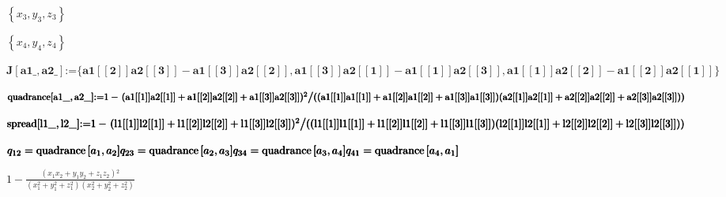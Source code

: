 \documentclass{article}
\begin{document}
\begin{doublespace}
\noindent\(\left\{x_3,y_3,z_3\right\}\)
\end{doublespace}

\begin{doublespace}
\noindent\(\left\{x_4,y_4,z_4\right\}\)
\end{doublespace}

\begin{doublespace}
\noindent\(\pmb{J[\text{a1$\_$},\text{a2$\_$}]\text{:=} \{\text{a1}[[2]]\text{a2}[[3]] - \text{a1}[[3]]\text{a2}[[2]], \text{a1}[[3]]\text{a2}[[1]]-\text{a1}[[1]]\text{a2}[[3]],
\text{a1}[[1]]\text{a2}[[2]]-\text{a1}[[2]]\text{a2}[[1]]\}}\)
\end{doublespace}

\begin{doublespace}
\noindent\(\pmb{\text{quadrance}[\text{a1$\_$},\text{a2$\_$}]\text{:=} }\\
\pmb{1 - \left.(\text{a1}[[1]]\text{a2}[[1]]+\text{a1}[[2]]\text{a2}[[2]]+\text{a1}[[3]]\text{a2}[[3]])^2\right/}\\
\pmb{((\text{a1}[[1]]\text{a1}[[1]]+\text{a1}[[2]]\text{a1}[[2]]+\text{a1}[[3]]\text{a1}[[3]])(\text{a2}[[1]]\text{a2}[[1]]+\text{a2}[[2]]\text{a2}[[2]]+\text{a2}[[3]]\text{a2}[[3]]))}\)
\end{doublespace}

\begin{doublespace}
\noindent\(\pmb{\text{spread}[\text{l1$\_$},\text{l2$\_$}]\text{:=} }\\
\pmb{1 - \left.(\text{l1}[[1]]\text{l2}[[1]]+\text{l1}[[2]]\text{l2}[[2]]+\text{l1}[[3]]\text{l2}[[3]])^2\right/}\\
\pmb{((\text{l1}[[1]]\text{l1}[[1]]+\text{l1}[[2]]\text{l1}[[2]]+\text{l1}[[3]]\text{l1}[[3]])(\text{l2}[[1]]\text{l2}[[1]]+\text{l2}[[2]]\text{l2}[[2]]+\text{l2}[[3]]\text{l2}[[3]]))}\)
\end{doublespace}

\begin{doublespace}
\noindent\(\pmb{q_{12}=\text{quadrance}\left[a_1,a_2\right]}\\
\pmb{q_{23}=\text{quadrance}\left[a_2,a_3\right]}\\
\pmb{q_{34}=\text{quadrance}\left[a_3,a_4\right]}\\
\pmb{q_{41}=\text{quadrance}\left[a_4,a_1\right]}\)
\end{doublespace}

\begin{doublespace}
\noindent\(1-\frac{\left(x_1 x_2+y_1 y_2+z_1 z_2\right){}^2}{\left(x_1^2+y_1^2+z_1^2\right) \left(x_2^2+y_2^2+z_2^2\right)}\)
\end{doublespace}
\end{document}
